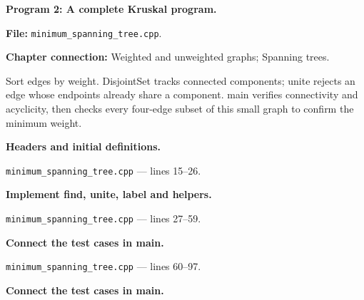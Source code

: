 \textbf{Program 2: A complete Kruskal program.}

\textbf{File:} \texttt{minimum\_spanning\_tree.cpp}.

\textbf{Chapter connection:} Weighted and unweighted graphs; Spanning trees.

Sort edges by weight. DisjointSet tracks connected components; unite rejects an edge whose endpoints already share a component. main verifies connectivity and acyclicity, then checks every four-edge subset of this small graph to confirm the minimum weight.



\begin{utpsteps}\setcounter{enumi}{0}\item \textbf{Headers and initial definitions.}\end{utpsteps}

\texttt{minimum\_spanning\_tree.cpp} --- lines 15--26.




\tcbbreak

\begin{utpsteps}\setcounter{enumi}{1}\item \textbf{Implement find, unite, label and helpers.}\end{utpsteps}

\texttt{minimum\_spanning\_tree.cpp} --- lines 27--59.






\tcbbreak

\begin{utpsteps}\setcounter{enumi}{2}\item \textbf{Connect the test cases in main.}\end{utpsteps}

\texttt{minimum\_spanning\_tree.cpp} --- lines 60--97.




\tcbbreak

\begin{utpsteps}\setcounter{enumi}{3}\item \textbf{Connect the test cases in main.}\end{utpsteps}

